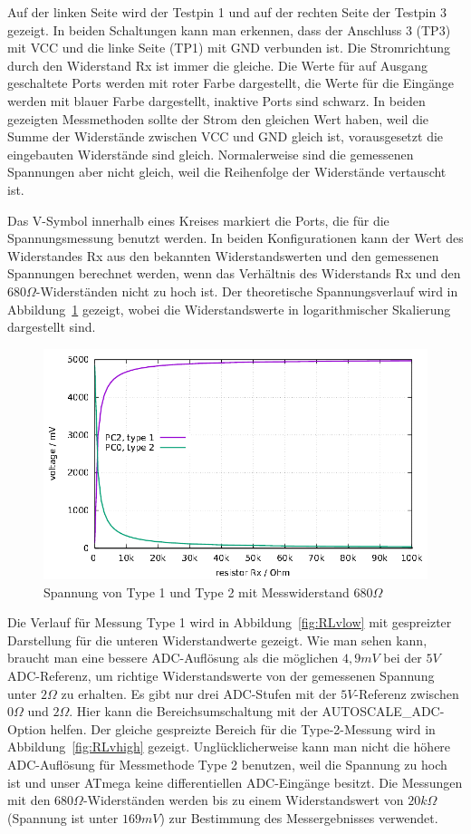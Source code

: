 Auf der linken Seite wird der Testpin 1 und auf der rechten Seite der Testpin 3 gezeigt.
In beiden Schaltungen kann man erkennen, dass der Anschluss 3 (TP3) mit VCC und die linke Seite (TP1) mit
GND verbunden ist.
Die Stromrichtung durch den Widerstand Rx ist immer die gleiche.
Die Werte für auf Ausgang geschaltete Ports werden mit roter Farbe dargestellt, 
die Werte für die Eingänge werden mit blauer Farbe dargestellt, inaktive Ports sind schwarz.
In beiden gezeigten Messmethoden sollte der Strom den gleichen Wert haben, weil die Summe der Widerstände zwischen
VCC und GND gleich ist, vorausgesetzt die eingebauten Widerstände sind gleich.
Normalerweise sind die gemessenen Spannungen aber nicht gleich, weil die Reihenfolge
der Widerstände vertauscht ist.

Das V-Symbol innerhalb eines Kreises markiert die Ports, die für die Spannungsmessung benutzt werden.
In beiden Konfigurationen kann der Wert des Widerstandes Rx aus den bekannten Widerstandswerten
und den gemessenen Spannungen berechnet werden, wenn das Verhältnis des Widerstands Rx und den \(680\Omega\)-Widerständen
 nicht zu hoch ist.
Der theoretische Spannungsverlauf wird in Abbildung~\ref{fig:RLvtot} gezeigt, wobei die Widerstandswerte 
in logarithmischer Skalierung dargestellt sind.
\begin{figure}[H]
\centering
\includegraphics[width=16cm]{../GNU/RLvtot.pdf}
\caption{Spannung von Type 1 und Type 2 mit Messwiderstand \(680\Omega\) }
\label{fig:RLvtot}
\end{figure}
Die Verlauf für Messung Type 1 wird in Abbildung~\ref{fig:RLvlow} mit gespreizter Darstellung für die unteren Widerstandwerte gezeigt.
Wie man sehen kann, braucht man eine bessere ADC-Auflösung als die möglichen \(4,9mV\) bei der \(5V\) ADC-Referenz, um richtige
Widerstandswerte von der gemessenen Spannung unter \(2\Omega\) zu erhalten.
Es gibt nur drei ADC-Stufen mit der \(5V\)-Referenz zwischen \(0\Omega\) und \(2\Omega\).
Hier kann die Bereichsumschaltung mit der AUTOSCALE\_ADC-Option helfen.
Der gleiche gespreizte Bereich für die Type-2-Messung wird in Abbildung~\ref{fig:RLvhigh} gezeigt.
Unglücklicherweise kann man nicht die höhere ADC-Auflösung für Messmethode Type 2 benutzen,
weil die Spannung zu hoch ist und unser ATmega keine differentiellen ADC-Eingänge besitzt.
Die Messungen mit den \(680\Omega\)-Widerständen werden bis zu einem Widerstandswert von 
\(20k\Omega\) (Spannung ist unter \(169mV\)) zur Bestimmung des Messergebnisses verwendet.

